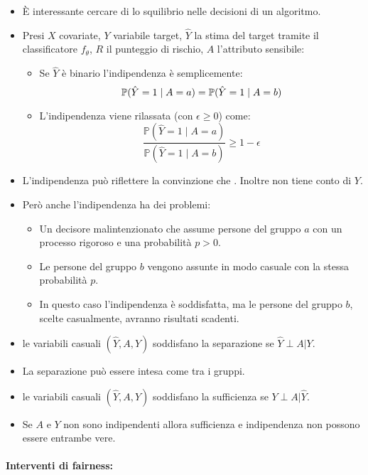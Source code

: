 \begin{itemize}
  \item È interessante cercare di  lo squilibrio nelle decisioni di un algoritmo. 
  \item Presi $X$ covariate, $Y$ variabile target, $\hat Y$ la stima del target tramite il classificatore $f_\theta$, $R$ il punteggio di rischio, $A$ l'attributo sensibile: 
    \begin{itemize}
      \item Se $\hat Y$ è binario l'indipendenza è semplicemente: 
        $$\mathbb{P}(\hat{Y}=1 \mid A=a) = \mathbb{P}(\hat{Y}=1 \mid A=b)$$
      \item L'indipendenza viene rilassata (con $\epsilon \geq 0$) come:
        $$
\frac{\mathbb{P}(\hat{Y}=1 \mid A=a)}{\mathbb{P}(\hat{Y}=1 \mid A=b)} \geq 1 - \epsilon
$$
    \end{itemize}
  \item L'indipendenza può riflettere la convinzione che . Inoltre non tiene conto di $Y$. 
  \item Però anche l'indipendenza ha dei problemi: 
    \begin{itemize}
      \item Un decisore malintenzionato che assume persone del gruppo $a$ con un processo rigoroso e una probabilità $p > 0$.
      \item Le persone del gruppo $b$ vengono assunte in modo casuale con la stessa probabilità $p$. 
      \item In questo caso l'indipendenza è soddisfatta, ma le persone del gruppo $b$, scelte casualmente, avranno risultati scadenti.
    \end{itemize}
  \item {} le variabili casuali $(\hat Y, A, Y)$ soddisfano la separazione se $\hat Y \perp A | Y$.
  \item La separazione può essere intesa come  tra i gruppi.    
      \item {} le variabili casuali $(\hat Y, A, Y)$ soddisfano la sufficienza se $Y \perp A | \hat Y$.
      \item Se $A$ e $Y$ non sono indipendenti allora sufficienza e indipendenza non possono essere entrambe vere.
\end{itemize}

\paragraph{Interventi di fairness:}

